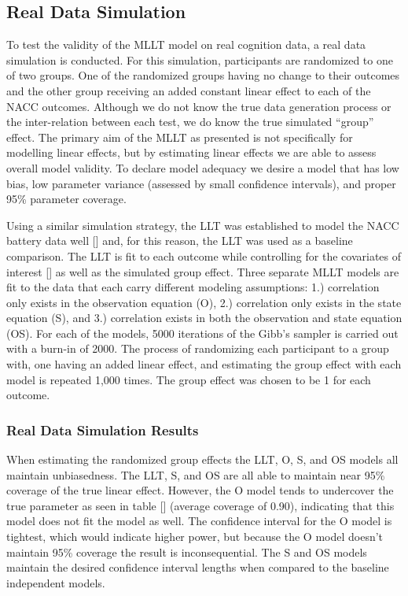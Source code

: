 \documentclass[
]{article}
\author{}
\date{\vspace{-2.5em}}
\begin{document}
\hypertarget{real-data-simulation}{%
\subsection{Real Data Simulation}\label{real-data-simulation}}

To test the validity of the MLLT model on real cognition data, a real data simulation is conducted. For this simulation, participants are randomized to one of two groups. One of the randomized groups having no change to their outcomes and the other group receiving an added constant linear effect to each of the NACC outcomes. Although we do not know the true data generation process or the inter-relation between each test, we do know the true simulated ``group'' effect. The primary aim of the MLLT as presented is not specifically for modelling linear effects, but by estimating linear effects we are able to assess overall model validity. To declare model adequacy we desire a model that has low bias, low parameter variance (assessed by small confidence intervals), and proper 95\% parameter coverage.

Using a similar simulation strategy, the LLT was established to model the NACC battery data well {[}{]} and, for this reason, the LLT was used as a baseline comparison. The LLT is fit to each outcome while controlling for the covariates of interest {[}{]} as well as the simulated group effect. Three separate MLLT models are fit to the data that each carry different modeling assumptions: 1.) correlation only exists in the observation equation (O), 2.) correlation only exists in the state equation (S), and 3.) correlation exists in both the observation and state equation (OS). For each of the models, 5000 iterations of the Gibb's sampler is carried out with a burn-in of 2000. The process of randomizing each participant to a group with, one having an added linear effect, and estimating the group effect with each model is repeated 1,000 times. The group effect was chosen to be 1 for each outcome.

\hypertarget{real-data-simulation-results}{%
\subsubsection{Real Data Simulation Results}\label{real-data-simulation-results}}

When estimating the randomized group effects the LLT, O, S, and OS models all maintain unbiasedness. The LLT, S, and OS are all able to maintain near 95\% coverage of the true linear effect. However, the O model tends to undercover the true parameter as seen in table {[}{]} (average coverage of 0.90), indicating that this model does not fit the model as well. The confidence interval for the O model is tightest, which would indicate higher power, but because the O model doesn't maintain 95\% coverage the result is inconsequential. The S and OS models maintain the desired confidence interval lengths when compared to the baseline independent models.
\end{document}
